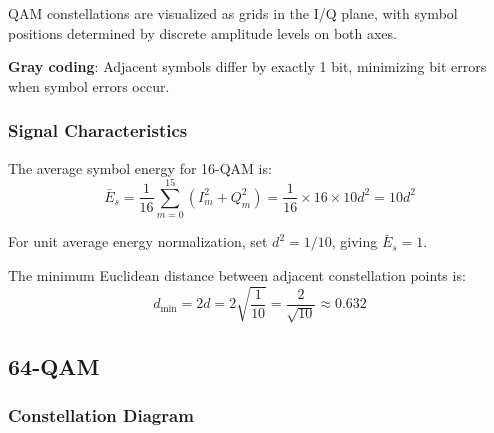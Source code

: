 QAM constellations are visualized as grids in the I/Q plane, with symbol positions determined by discrete amplitude levels on both axes.

\begin{center}
\end{center}

\textbf{Gray coding}: Adjacent symbols differ by exactly 1 bit, minimizing bit errors when symbol errors occur.

\subsubsection{Signal Characteristics}

The average symbol energy for 16-QAM is:
\begin{equation}
\bar{E}_s = \frac{1}{16}\sum_{m=0}^{15} (I_m^2 + Q_m^2) = \frac{1}{16} \times 16 \times 10d^2 = 10d^2
\label{eq:16qam-energy}
\end{equation}

For unit average energy normalization, set $d^2 = 1/10$, giving $\bar{E}_s = 1$.

The minimum Euclidean distance between adjacent constellation points is:
\begin{equation}
d_{\min} = 2d = 2\sqrt{\frac{1}{10}} = \frac{2}{\sqrt{10}} \approx 0.632
\label{eq:16qam-distance}
\end{equation}

\subsection{64-QAM}

\subsubsection{Constellation Diagram}


